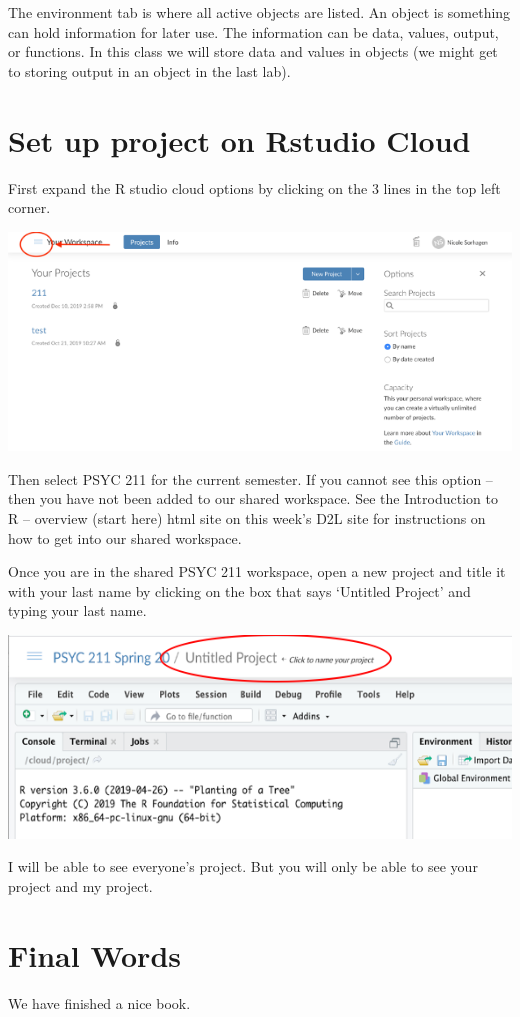 \documentclass[]{book}
\begin{document}
The environment tab is where all active objects are listed. An object is something can hold information for later use. The information can be data, values, output, or functions. In this class we will store data and values in objects (we might get to storing output in an object in the last lab).

\hypertarget{set-up-project-on-rstudio-cloud}{%
\chapter{Set up project on Rstudio Cloud}\label{set-up-project-on-rstudio-cloud}}

First expand the R studio cloud options by clicking on the 3 lines in the top left corner.

\includegraphics{img/Picture1.png}

Then select PSYC 211 for the current semester. If you cannot see this option -- then you have not been added to our shared workspace. See the Introduction to R -- overview (start here) html site on this week's D2L site for instructions on how to get into our shared workspace.

Once you are in the shared PSYC 211 workspace, open a new project and title it with your last name by clicking on the box that says `Untitled Project' and typing your last name.

\includegraphics{img/Projname.png}

I will be able to see everyone's project. But you will only be able to see your project and my project.

\hypertarget{final-words}{%
\chapter{Final Words}\label{final-words}}

We have finished a nice book.


\end{document}
